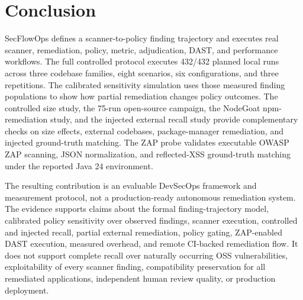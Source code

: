 \section{Conclusion}

SecFlowOps defines a scanner-to-policy finding trajectory and executes real scanner, remediation, policy, metric, adjudication, DAST, and performance workflows. The full controlled protocol executes 432/432 planned local runs across three codebase families, eight scenarios, six configurations, and three repetitions. The calibrated sensitivity simulation uses those measured finding populations to show how partial remediation changes policy outcomes. The controlled size study, the 75-run open-source campaign, the NodeGoat npm-remediation study, and the injected external recall study provide complementary checks on size effects, external codebases, package-manager remediation, and injected ground-truth matching. The ZAP probe validates executable OWASP ZAP scanning, JSON normalization, and reflected-XSS ground-truth matching under the reported Java 24 environment.

The resulting contribution is an evaluable DevSecOps framework and measurement protocol, not a production-ready autonomous remediation system. The evidence supports claims about the formal finding-trajectory model, calibrated policy sensitivity over observed findings, scanner execution, controlled and injected recall, partial external remediation, policy gating, ZAP-enabled DAST execution, measured overhead, and remote CI-backed remediation flow. It does not support complete recall over naturally occurring OSS vulnerabilities, exploitability of every scanner finding, compatibility preservation for all remediated applications, independent human review quality, or production deployment.
